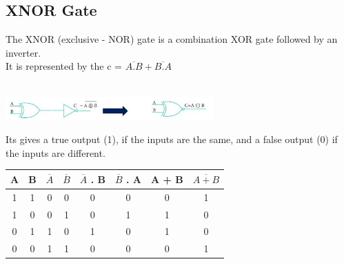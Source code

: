 \documentclass[10pt,a4paper,onecolumn]{article}
\begin{document}
\subsection{XNOR Gate}
The XNOR (exclusive - NOR) gate is a combination XOR gate followed by an inverter. \\
 It is represented by the \color{red} c = $\overline{A.B} + \overline{B.A}$  \\ \color{black} \\
\begin{center}\includegraphics[width=8cm]{gst21}\end{center}
Its gives a  true output (1), if the inputs are the same, and a false output (0) if the inputs are different. \\
\begin{table}[h!]
	\begin{center}
		\begin{tabular}{c|c|c|c|c|c|c|c}
			\textbf{A} & \textbf{B} & \textbf{$\overline{A}$} & \textbf{$\overline{B}$} & \textbf{$\overline{A}$ . B} & \textbf{$\overline{B}$ . A} & \textbf{A} + \textbf{B} & \textbf{$\overline{A + B}$}\\
			\hline
			1 & 1 & 0 & 0 & 0 & 0 & 0 & 1\\
			\hline
			1 & 0 & 0 & 1 & 0 & 1 & 1 & 0\\
			\hline
			0 & 1 & 1 & 0 & 1 & 0 & 1 & 0\\
			\hline
			0 & 0 & 1 & 1 & 0 & 0 & 0 & 1\\
			\hline
		\end{tabular}
	\end{center}
\end{table} \\
\end{document}
